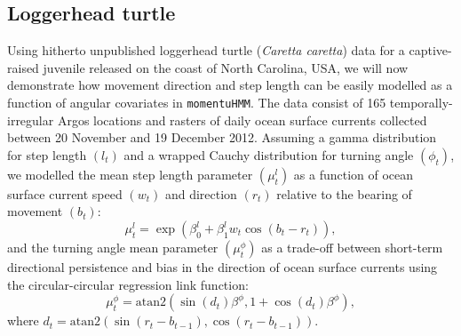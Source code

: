 \documentclass[12pt]{article}\usepackage[]{graphicx}\usepackage[]{color}
\begin{document}
\subsection{Loggerhead turtle}
\label{sec:turtle}
Using hitherto unpublished loggerhead turtle ({\it Caretta caretta}) data for a captive-raised juvenile released on the coast of North Carolina, USA, we will now demonstrate how movement direction and step length can be easily modelled as a function of angular covariates in \verb|momentuHMM|. The data consist of 165 temporally-irregular Argos locations and rasters of daily ocean surface currents collected between 20 November and 19 December 2012. Assuming a gamma distribution for step length $(l_t)$ and a wrapped Cauchy distribution for turning angle $(\phi_t)$, we modelled the mean step length parameter $(\mu^l_t)$ as a function of ocean surface current speed $(w_t)$ and direction $(r_t)$ relative to the bearing of movement $(b_t)$:
\begin{equation}
  \mu^l_t=\exp(\beta^l_0+\beta^l_1 w_t \cos(b_t-r_t)),
  \label{eq:turtleMeanStep}
\end{equation}
and the turning angle mean parameter $(\mu^\phi_t)$ as a trade-off between short-term directional persistence and bias in the direction of ocean surface currents using the circular-circular regression link function:
\begin{equation}
  \mu^\phi_t=\text{atan2}(\sin(d_t) \beta^\phi,1+\cos(d_t)\beta^\phi),
    \label{eq:turtleMeanAngle}
\end{equation}
where $d_t=\text{atan2}(\sin(r_t-b_{t-1}),\cos(r_t-b_{t-1}))$.
\end{document}
